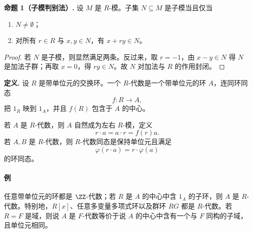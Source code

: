 \noindent\textbf{命题 1（子模判别法）.} 设 $M$ 是 $R$-模。子集 $N\subseteq M$ 是子模当且仅当
\begin{enumerate}[label=(\arabic*)]
	\item $N\neq\emptyset$；
	\item 对所有 $r\in R$ 与 $x,y\in N$，有 $x+ry\in N$。
\end{enumerate}

\begin{proof}
	若 $N$ 是子模，则显然满足两条。反过来，取 $r=-1$，由 $x-y\in N$ 得 $N$ 是加法子群；再取 $x=0$，得 $ry\in N$。故 $N$ 对加法与 $R$ 的作用封闭。
\end{proof}


\noindent\textbf{定义.} 设 $R$ 是带单位元的交换环。一个 $R$-代数是一个带单位元的环 $A$，连同环同态
\[
f:R\longrightarrow A,
\]
把 $1_R$ 映到 $1_A$，并且 $f(R)$ 包含于 $A$ 的中心。

若 $A$ 是 $R$-代数，则 $A$ 自然成为左右 $R$-模，定义
\[
r\cdot a=a\cdot r=f(r)a.
\]
若 $A,B$ 是 $R$-代数，则 $R$-代数同态是保持单位元且满足
\[
\varphi(r\cdot a)=r\cdot\varphi(a)
\]
的环同态。

\paragraph{例}
任意带单位元的环都是 $\ZZ$-代数；若 $R$ 是 $A$ 的中心中含 $1_A$ 的子环，则 $A$ 是 $R$-代数。特别地，$R[x]$、任意多变量多项式环以及群环 $RG$ 都是 $R$-代数。若 $R=F$ 是域，则说 $A$ 是 $F$-代数等价于说 $A$ 的中心中含有一个与 $F$ 同构的子域，且单位元相同。



